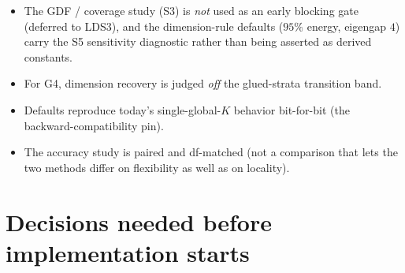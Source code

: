 \documentclass[11pt]{article}
\begin{document}
\begin{itemize}[leftmargin=1.4em]
(Lepski is); the build sequence (\S\ref{sec:sequence}) implements Lepski first.
\item The GDF / coverage study (S3) is \emph{not} used as an early blocking gate (deferred
to LDS3), and the dimension-rule defaults ($95\%$ energy, eigengap $4$) carry the S5
sensitivity diagnostic rather than being asserted as derived constants.
\item For G4, dimension recovery is judged \emph{off} the glued-strata transition band.
\item Defaults reproduce today's single-global-$K$ behavior bit-for-bit (the
backward-compatibility pin).
\item The accuracy study is paired and df-matched (not a comparison that lets the two
methods differ on flexibility as well as on locality).
\end{itemize}

\section{Decisions needed before implementation starts}\label{sec:decisions}
\end{document}
